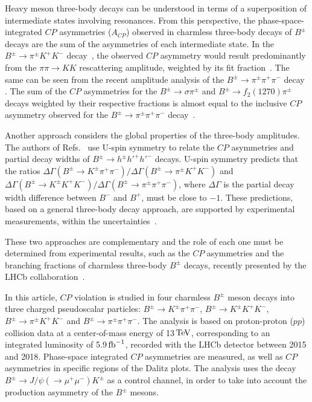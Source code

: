 \documentclass[12pt,a4paper]{article}
\def\Ppi         {\ensuremath{\uppi}\xspace}
\def\PB      {\ensuremath{\mathrm{B}}\xspace}
\def\PK      {\ensuremath{\mathrm{K}}\xspace}
\def\Ppi         {\ensuremath{\pi}\xspace}
\def\PB      {\ensuremath{B}\xspace}
\def\PK      {\ensuremath{K}\xspace}
\def\pion   {{\ensuremath{\Ppi}}\xspace}
\def\pip    {{\ensuremath{\pion^+}}\xspace}
\def\pim    {{\ensuremath{\pion^-}}\xspace}
\def\pipm   {{\ensuremath{\pion^\pm}}\xspace}
\def\kaon    {{\ensuremath{\PK}}\xspace}
\def\Kp      {{\ensuremath{\kaon^+}}\xspace}
\def\Km      {{\ensuremath{\kaon^-}}\xspace}
\def\Kpm     {{\ensuremath{\kaon^\pm}}\xspace}
\def\B       {{\ensuremath{\PB}}\xspace}
\def\Bpm     {{\ensuremath{\B^\pm}}\xspace}
\def\to                 {\ensuremath{\rightarrow}\xspace}
\def\CP                {{\ensuremath{C\!P}}\xspace}
\newcommand{\aunit}[1]{\ensuremath{\text{\,#1}}}
\newcommand{\tev}{\aunit{Te\kern -0.1em V}\xspace}
\def\fb   {\ensuremath{\aunit{fb}}\xspace}
\def\invfb   {\ensuremath{\fb^{-1}}\xspace}
\def\pipipi {\ensuremath{{\Bpm \to \pipm \pip \pim}}\xspace}
\def\kpipi {\ensuremath{{\Bpm \to \Kpm \pip \pim}}\xspace}
\def\kkpi {\ensuremath{{\Bpm \to \pipm \Kp \Km }}\xspace}
\def\kkk {\ensuremath{{\Bpm \to \Kpm \Kp \Km}}\xspace}
\def\acp {\ensuremath{A_{\CP}}\xspace}
\begin{document}
Heavy meson three-body decays can be understood in terms of a superposition of intermediate states involving resonances. From this perspective, the phase-space-integrated \CP asymmetries (\acp) observed in charmless three-body decays of $B^{\pm}$ decays are the sum of the asymmetries of each intermediate state. In the \kkpi decay~\cite{LHCb-PAPER-2014-044}, the observed \CP asymmetry would result predominantly from the $\pi\pi \to KK$ rescattering amplitude, weighted by its fit fraction~\cite{LHCb-PAPER-2018-051}. 
The same can be seen from the recent amplitude analysis of the \pipipi decay \cite{LHCb-PAPER-2019-017,LHCb-PAPER-2019-018}. The sum of the \CP asymmetries for the $B^{\pm} \to \sigma \pi^{\pm}$ and  $B^{\pm} \to f_2(1270) \pi^{\pm}$ decays weighted by their respective fractions is almost equal to the inclusive \CP asymmetry observed for the \pipipi decay~\cite{LHCb-PAPER-2014-044}.

Another approach considers the global properties of the three-body amplitudes.
The authors of Refs.~\cite{Gronau2003,Gronau2013,Gronau2014} use U-spin symmetry to relate the \CP asymmetries and partial decay widths of $B^\pm \to h^\pm h'^+ h'^-$ decays. U-spin symmetry predicts that the ratios \mbox{$\Delta\Gamma(B^\pm \to K^\pm \pi^+ \pi^-) / \Delta\Gamma(B^\pm \to \pi^\pm K^+ K^-)$} and \mbox{$\Delta\Gamma(B^\pm \to K^\pm K^+ K^-) / \Delta\Gamma(B^\pm \to \pi^\pm \pi^+ \pi^-)$}, where $\Delta \Gamma$ is the partial decay width difference between $B^-$ and $B^+$, must be close to $-1$. These predictions, based on a general three-body decay approach, are supported by experimental measurements, within the  uncertainties~\cite{LHCb-PAPER-2014-044, Gronau2013,Xu2013, Pat2021}.

These two approaches are complementary and the role of each one must be determined from experimental results, such as the \CP asymmetries and the branching fractions of charmless three-body \Bpm decays, recently presented by the LHCb collaboration~\cite{LHCb-PAPER-2020-031}.

In this article, \CP violation is studied in four charmless $B^{\pm}$ meson decays into three charged pseudoscalar particles: \kpipi, \kkk, \kkpi and \pipipi. 
The analysis is based on proton-proton ($pp$) collision data at a center-of-mass energy of 13\tev, corresponding to an integrated luminosity of 5.9\invfb, recorded with the LHCb detector between 2015 and 2018. 
Phase-space integrated \CP asymmetries are measured, as well as \CP asymmetries in specific regions of the Dalitz plots. The analysis uses the decay $B^\pm \to J/\psi(\to \mu^+ \mu^-) K^\pm$ as a control channel, in order to take into account the production asymmetry of the $B^{\pm}$ mesons.
\end{document}
